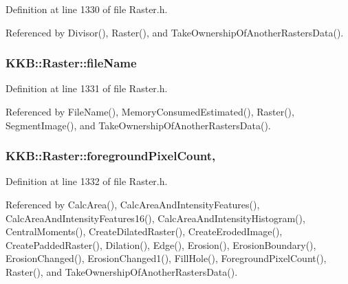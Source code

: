 Definition at line 1330 of file Raster.\+h.



Referenced by Divisor(), Raster(), and Take\+Ownership\+Of\+Another\+Rasters\+Data().

\subsubsection[{\texorpdfstring{file\+Name}{fileName}}]{ K\+K\+B\+::\+Raster\+::file\+Name\hspace{0.3cm}{\ttfamily [protected]}}\hypertarget{class_k_k_b_1_1_raster_a742e1da027493443f2dda570a89fe2e9}{}\label{class_k_k_b_1_1_raster_a742e1da027493443f2dda570a89fe2e9}


Definition at line 1331 of file Raster.\+h.



Referenced by File\+Name(), Memory\+Consumed\+Estimated(), Raster(), Segment\+Image(), and Take\+Ownership\+Of\+Another\+Rasters\+Data().

\subsubsection[{\texorpdfstring{foreground\+Pixel\+Count}{foregroundPixelCount}}]{ K\+K\+B\+::\+Raster\+::foreground\+Pixel\+Count\hspace{0.3cm}{\ttfamily [mutable]}, {\ttfamily [protected]}}\hypertarget{class_k_k_b_1_1_raster_aa7e86253f4b9c347da718732e44b60e8}{}\label{class_k_k_b_1_1_raster_aa7e86253f4b9c347da718732e44b60e8}


Definition at line 1332 of file Raster.\+h.



Referenced by Calc\+Area(), Calc\+Area\+And\+Intensity\+Features(), Calc\+Area\+And\+Intensity\+Features16(), Calc\+Area\+And\+Intensity\+Histogram(), Central\+Moments(), Create\+Dilated\+Raster(), Create\+Eroded\+Image(), Create\+Padded\+Raster(), Dilation(), Edge(), Erosion(), Erosion\+Boundary(), Erosion\+Changed(), Erosion\+Changed1(), Fill\+Hole(), Foreground\+Pixel\+Count(), Raster(), and Take\+Ownership\+Of\+Another\+Rasters\+Data().

